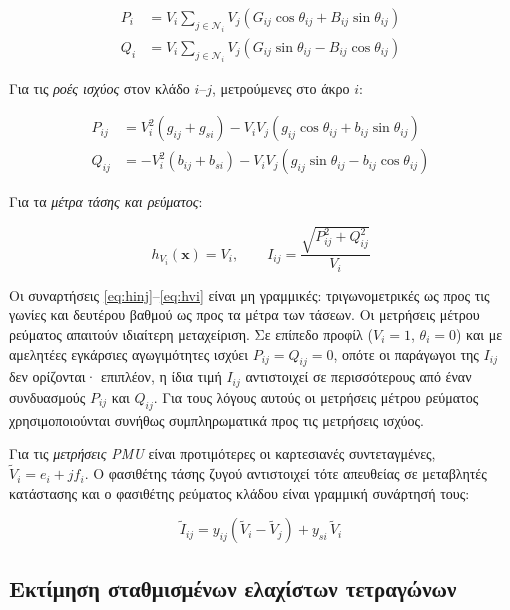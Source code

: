 \begin{align}
P_i &= V_i \sum_{j \in \mathcal{N}_i} V_j \left( G_{ij}\cos\theta_{ij} + B_{ij}\sin\theta_{ij} \right) \\
Q_i &= V_i \sum_{j \in \mathcal{N}_i} V_j \left( G_{ij}\sin\theta_{ij} - B_{ij}\cos\theta_{ij} \right)
\label{eq:hinj}
\end{align}

Για τις \emph{ροές ισχύος} στον κλάδο $i$--$j$, μετρούμενες στο άκρο $i$:

\begin{align}
P_{ij} &= V_i^2 \left( g_{ij} + g_{si} \right) - V_i V_j \left( g_{ij}\cos\theta_{ij} + b_{ij}\sin\theta_{ij} \right) \\
Q_{ij} &= -V_i^2 \left( b_{ij} + b_{si} \right) - V_i V_j \left( g_{ij}\sin\theta_{ij} - b_{ij}\cos\theta_{ij} \right)
\label{eq:hflow}
\end{align}

Για τα \emph{μέτρα τάσης και ρεύματος}:

\begin{equation}
h_{V_i}(\mathbf{x}) = V_i, \qquad
I_{ij} = \frac{\sqrt{P_{ij}^2 + Q_{ij}^2}}{V_i}
\label{eq:hvi}
\end{equation}

Οι συναρτήσεις \eqref{eq:hinj}--\eqref{eq:hvi} είναι μη γραμμικές: τριγωνομετρικές ως προς τις
γωνίες και δευτέρου βαθμού ως προς τα μέτρα των τάσεων. Οι μετρήσεις μέτρου ρεύματος απαιτούν
ιδιαίτερη μεταχείριση. Σε επίπεδο προφίλ ($V_i = 1$, $\theta_i = 0$) και με αμελητέες
εγκάρσιες αγωγιμότητες ισχύει $P_{ij} = Q_{ij} = 0$, οπότε οι παράγωγοι της $I_{ij}$ δεν
ορίζονται· επιπλέον, η ίδια τιμή $I_{ij}$ αντιστοιχεί σε περισσότερους από έναν συνδυασμούς
$P_{ij}$ και $Q_{ij}$. Για τους λόγους αυτούς οι μετρήσεις μέτρου ρεύματος χρησιμοποιούνται
συνήθως συμπληρωματικά προς τις μετρήσεις ισχύος.

Για τις \emph{μετρήσεις PMU} είναι προτιμότερες οι καρτεσιανές συντεταγμένες,
$\tilde{V}_i = e_i + j f_i$. Ο φασιθέτης τάσης ζυγού αντιστοιχεί τότε απευθείας σε μεταβλητές
κατάστασης και ο φασιθέτης ρεύματος κλάδου είναι γραμμική συνάρτησή τους:

\begin{equation}
\tilde{I}_{ij} = y_{ij}\left(\tilde{V}_i - \tilde{V}_j\right) + y_{si}\,\tilde{V}_i
\label{eq:hpmu}
\end{equation}

\subsection{Εκτίμηση σταθμισμένων ελαχίστων τετραγώνων}

